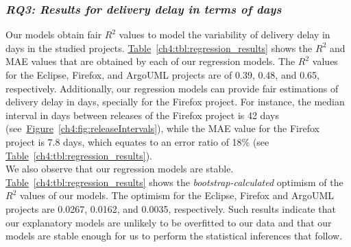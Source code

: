 \subsubsection*{\textit{\textbf{RQ3: Results for delivery delay in terms of days}}}

\noindent\DIFdelbegin \textbf{\textit{}%
} %
\DIFdelend \DIFaddbegin {} \DIFaddend Our models obtain fair $R^2$ values to
model the variability of delivery delay in days in the studied projects.
\hyperref[ch4:tbl:regression_results]{Table}~\ref{ch4:tbl:regression_results} shows the
$R^2$ and MAE values that are obtained by each of our regression models. The
$R^2$ values for the Eclipse, Firefox, and ArgoUML projects are of 0.39, 0.48,
and 0.65, respectively. 
Additionally, our regression models can provide fair
estimations of delivery delay in days, specially for the Firefox project. For
instance, the median interval in days between releases of the Firefox project is
42 days
(see~\hyperref[ch4:fig:releaseIntervals]{Figure}~\ref{ch4:fig:releaseIntervals}), while
the MAE value for the Firefox project is 7.8 days, which equates to an error
ratio of 18\% (see
\hyperref[ch4:tbl:regression_results]{Table}~\ref{ch4:tbl:regression_results}).\\

\noindent\DIFdelbegin \textbf{\textit{}%
} %
\DIFdelend \DIFaddbegin {} \DIFaddend We also
observe that our regression models are stable.
\hyperref[ch4:tbl:regression_results]{Table}~\ref{ch4:tbl:regression_results} shows the
\textit{bootstrap-calculated} optimism of the $R^2$ values of our models. The
optimism for the Eclipse, Firefox and ArgoUML projects are 0.0267, 0.0162, and 0.0035,
respectively. Such results indicate that our explanatory models are unlikely to
be overfitted to our data and that our models are stable enough for us to perform the
statistical inferences that follow. 



